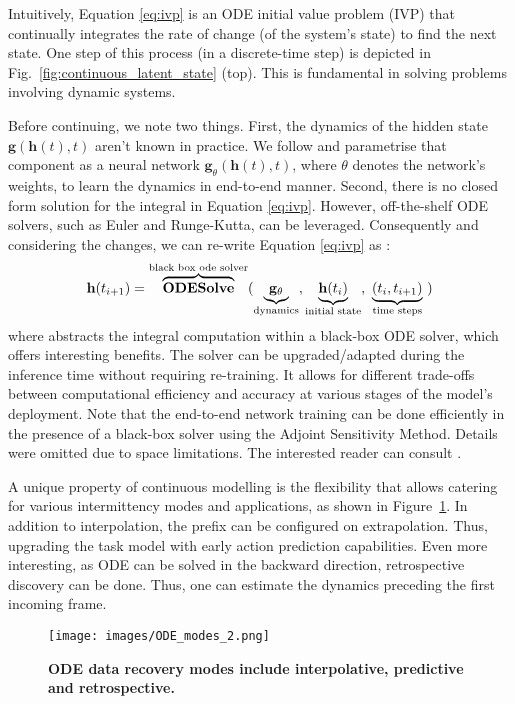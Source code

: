 \documentclass[10pt, conference, compsocconf]{IEEEtran}
\def\update#1{#1}
\begin{document}
Intuitively, Equation \eqref{eq:ivp} is an ODE initial value problem (IVP) that continually integrates the rate of change (of the system's state) to find the next state. One step of this process (in a \update{discrete-time} step) is depicted in Fig.~\ref{fig:continuous_latent_state} (top). This is fundamental in solving problems involving dynamic systems. 

Before continuing,  we note two things. First, the dynamics of the hidden state $\mathbf{g}(\mathbf{h}(t), t) $ aren't known in practice. We follow \cite{chen2018neural} and parametrise that component as a neural network $\mathbf{g}_{\theta}(\mathbf{h}(t), t)$, where $\theta$ denotes the network's weights, to learn the dynamics in end-to-end manner. Second, there is no \update{closed form} solution for the integral in Equation \eqref{eq:ivp}. However, off-the-shelf ODE solvers, such as Euler and Runge-Kutta, can be leveraged. Consequently and considering the changes, we can re-write Equation \eqref{eq:ivp} as :
\begin{equation}
    \mathbf{h}(t_{i+1}) = \overbrace{\textbf{\text{ODESolve}}}^{\text{black box ode solver}}(\underbrace{\mathbf{g}_{\theta}}_{\text{dynamics}},\underbrace{\mathbf{h}(t_{i})}_\text{initial state},\ \underbrace{(t_{i}, t_{i+1})}_{\text{time steps}}\ )
\label{eq:ode_solve}
\end{equation}
where \textbf{} abstracts the integral computation within a black-box ODE solver, which offers interesting benefits. The solver can be upgraded/adapted during the inference time without requiring re-training. It allows for different trade-offs between computational efficiency and accuracy at various stages of the model's deployment. Note that the end-to-end network training can be done efficiently in the presence of a black-box solver using the Adjoint Sensitivity Method. Details were omitted due to space limitations. The interested reader can consult \cite{chen2018neural}. 

A unique property of \update{continuous modelling is the flexibility} that allows catering for various intermittency modes and applications, \update{as shown in Figure~\ref{fig:forward_backward_mode}}. In addition to interpolation, the prefix can be configured on extrapolation. Thus, upgrading the task model with early action prediction \cite{wang2019progressive,kong2017deep} capabilities. Even more interesting, as ODE can be solved in the backward direction, retrospective discovery can be done. Thus, one can estimate the dynamics preceding the first incoming frame. 
\begin{figure}[t!]
    \centering
    \texttt{[image: images/ODE\_modes\_2.png]}
    \caption{\update{\textbf{ODE data recovery modes include interpolative, predictive and retrospective. }}}
    \label{fig:forward_backward_mode}
\end{figure}
\end{document}
